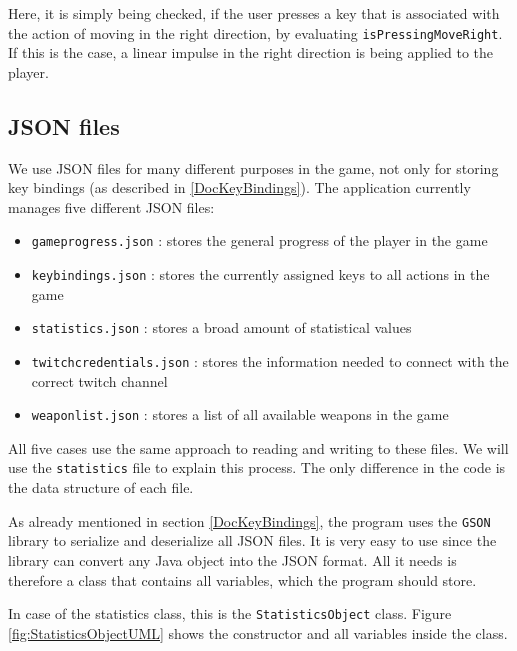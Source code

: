 \documentclass[12p]{article}
\begin{document}
Here, it is simply being checked, if the user presses a key that is associated with the action of moving in the right direction, by evaluating \texttt{isPressingMoveRight}. If this is the case, a linear impulse in the right direction is being applied to the player.

 
\subsection{JSON files} \label{JSONfiles}

We use JSON files for many different purposes in the game, not only for storing key bindings (as described in \ref{DocKeyBindings}). The application currently manages five different JSON files: 

\begin{itemize}
    \item[\faFile] \texttt{gameprogress.json} : stores the general progress of the player in the game
    \item[\faFile] \texttt{keybindings.json} : stores the currently assigned keys to all actions in the game
    \item[\faFile] \texttt{statistics.json} : stores a broad amount of statistical values
    \item[\faFile] \texttt{twitchcredentials.json} : stores the information needed to connect with the correct twitch channel
    \item[\faFile] \texttt{weaponlist.json} : stores a list of all available weapons in the game
\end{itemize}

All five cases use the same approach to reading and writing to these files. We will use the \texttt{statistics} file to explain this process. The only difference in the code is the data structure of each file.

As already mentioned in section \ref{DocKeyBindings}, the program uses the \texttt{GSON} library to serialize and deserialize all JSON files. It is very easy to use since the library can convert any Java object into the JSON format. All it needs is therefore a class that contains all variables, which the program should store.

In case of the statistics class, this is the \texttt{StatisticsObject} class. Figure \ref{fig:StatisticsObjectUML} shows the constructor and all variables inside the class.
\end{document}
